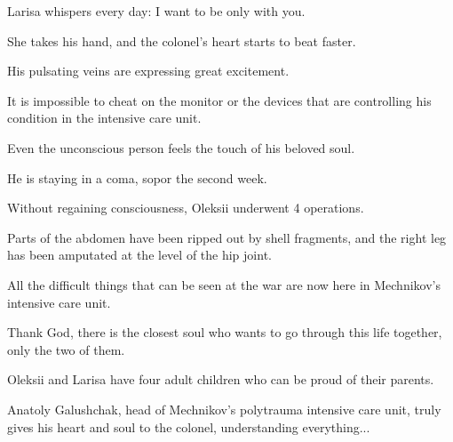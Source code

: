 Larisa whispers every day: I want to be only with you.

She takes his hand, and the colonel's heart starts to beat faster.

His pulsating veins are expressing great excitement.

It is impossible to cheat on the monitor or the devices that are controlling
his condition in the intensive care unit.

Even the unconscious person feels the touch of his beloved soul.

He is staying in a coma, sopor the second week.

Without regaining consciousness, Oleksii underwent 4 operations.

Parts of the abdomen have been ripped out by shell fragments, and the right leg
has been amputated at the level of the hip joint.

All the difficult things that can be seen at the war are now here in
Mechnikov's intensive care unit.

Thank God, there is the closest soul who wants to go through this life
together, only the two of them.

Oleksii and Larisa have four adult children who can be proud of their parents.

Anatoly Galushchak, head of Mechnikov's polytrauma intensive care unit, truly
gives his heart and soul to the colonel, understanding everything...
